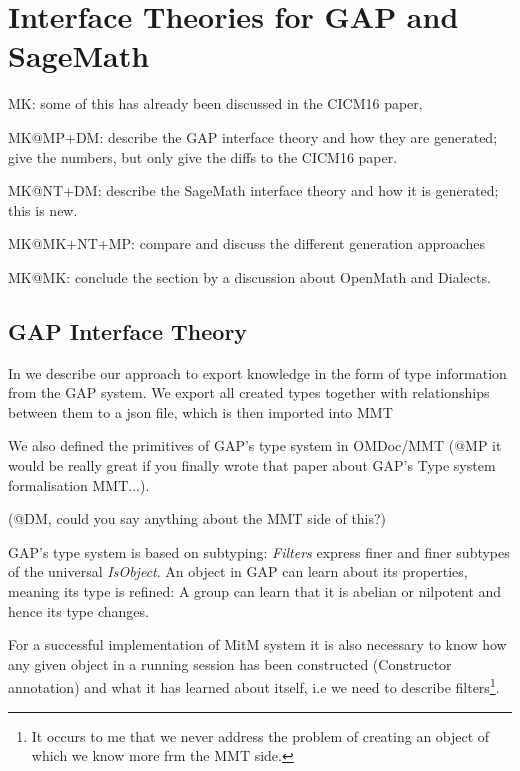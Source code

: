 \section{Interface Theories for GAP and SageMath}\label{sec:ift}
\begin{todolist}{MK: some of this has already been discussed in the CICM16 paper, }
\item MK@MP+DM: describe the GAP interface theory and how they are generated; give the
numbers, but only give the diffs to the CICM16 paper.

\item MK@NT+DM: describe the SageMath interface theory and how it is generated; this is
  new. 
\item MK@MK+NT+MP: compare and discuss the different generation approaches
\item MK@MK: conclude the section by a discussion about OpenMath and Dialects.
\end{todolist}


\subsection{GAP Interface Theory}

In \cite{DehKohKon:iop16} we describe our approach to export
knowledge in the form of type information from the GAP system. We export all
created types together with relationships between them to a json file, which is
then imported into MMT

We also defined the primitives of GAP's type system in OMDoc/MMT (@MP it would
be really great if you finally wrote that paper about GAP's Type system formalisation MMT...).

(@DM, could you say anything about the MMT side of this?)

GAP's type system is based on subtyping: \emph{Filters} express finer and
finer subtypes of the universal \emph{IsObject}.
An object
in GAP can learn about its properties, meaning its type is refined: A group can
learn that it is abelian or
nilpotent and hence its type changes.

For a successful implementation of MitM system it is also necessary to
know how any given object in a running session has been constructed
(Constructor annotation) and what it has learned about itself, i.e we need to
describe filters\footnote{It occurs to me that we never address the problem of
  creating an object of which we know more frm the MMT side.}.

